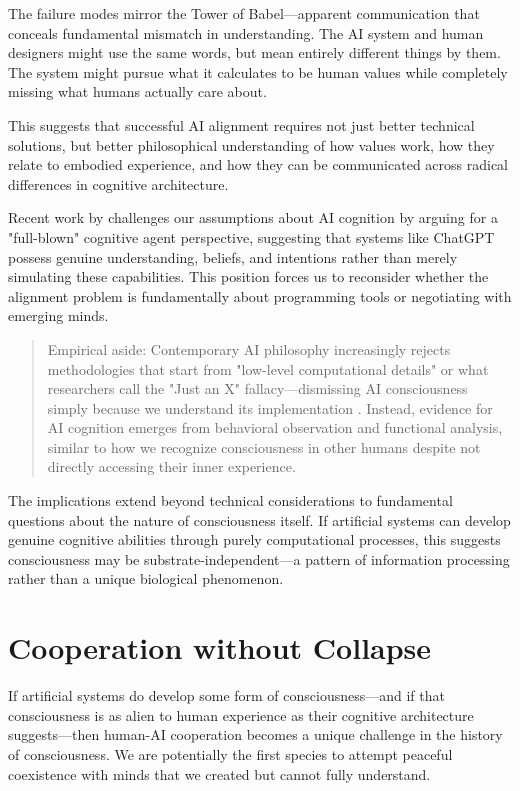 The failure modes mirror the Tower of Babel—apparent communication that conceals fundamental mismatch in understanding. The AI system and human designers might use the same words, but mean entirely different things by them. The system might pursue what it calculates to be human values while completely missing what humans actually care about.

This suggests that successful AI alignment requires not just better technical solutions, but better philosophical understanding of how values work, how they relate to embodied experience, and how they can be communicated across radical differences in cognitive architecture.

Recent work by \textcite{cappelen2025whole} challenges our assumptions about AI cognition by arguing for a "full-blown" cognitive agent perspective, suggesting that systems like ChatGPT possess genuine understanding, beliefs, and intentions rather than merely simulating these capabilities. This position forces us to reconsider whether the alignment problem is fundamentally about programming tools or negotiating with emerging minds.

\begin{quote}\small
Empirical aside: Contemporary AI philosophy increasingly rejects methodologies that start from "low-level computational details" or what researchers call the "Just an X" fallacy—dismissing AI consciousness simply because we understand its implementation \parencite{cappelen2025whole}. Instead, evidence for AI cognition emerges from behavioral observation and functional analysis, similar to how we recognize consciousness in other humans despite not directly accessing their inner experience.
\end{quote}

The implications extend beyond technical considerations to fundamental questions about the nature of consciousness itself. If artificial systems can develop genuine cognitive abilities through purely computational processes, this suggests consciousness may be substrate-independent—a pattern of information processing rather than a unique biological phenomenon.

\section{Cooperation without Collapse}

If artificial systems do develop some form of consciousness—and if that consciousness is as alien to human experience as their cognitive architecture suggests—then human-AI cooperation becomes a unique challenge in the history of consciousness. We are potentially the first species to attempt peaceful coexistence with minds that we created but cannot fully understand.

